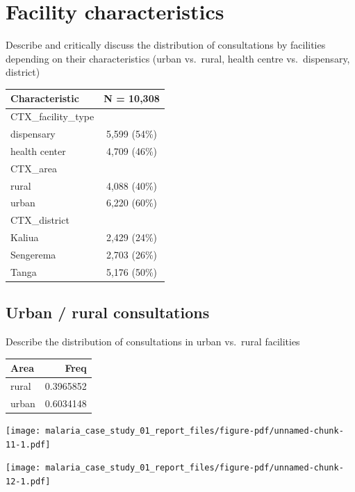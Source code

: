 \documentclass[
  letterpaper,
  DIV=11,
  numbers=noendperiod,
  oneside]{scrreprt}
\begin{document}
\hypertarget{facility-characteristics}{%
\section{Facility characteristics}\label{facility-characteristics}}

Describe and critically discuss the distribution of consultations by
facilities depending on their characteristics (urban vs.~rural, health
centre vs.~dispensary, district)

\begin{longtable}[]{@{}lc@{}}
\toprule\noalign{}
\textbf{Characteristic} & \textbf{N = 10,308} \\
\midrule\noalign{}
\endhead
\bottomrule\noalign{}
\endlastfoot
CTX\_facility\_type & \\
dispensary & 5,599 (54\%) \\
health center & 4,709 (46\%) \\
CTX\_area & \\
rural & 4,088 (40\%) \\
urban & 6,220 (60\%) \\
CTX\_district & \\
Kaliua & 2,429 (24\%) \\
Sengerema & 2,703 (26\%) \\
Tanga & 5,176 (50\%) \\
\end{longtable}

\hypertarget{urban-rural-consultations}{%
\subsection{Urban / rural
consultations}\label{urban-rural-consultations}}

Describe the distribution of consultations in urban vs.~rural facilities

\begin{longtable}[]{@{}lr@{}}
\toprule\noalign{}
Area & Freq \\
\midrule\noalign{}
\endhead
\bottomrule\noalign{}
\endlastfoot
rural & 0.3965852 \\
urban & 0.6034148 \\
\end{longtable}

\texttt{[image: malaria\_case\_study\_01\_report\_files/figure-pdf/unnamed-chunk-11-1.pdf]}

\texttt{[image: malaria\_case\_study\_01\_report\_files/figure-pdf/unnamed-chunk-12-1.pdf]}
\end{document}
